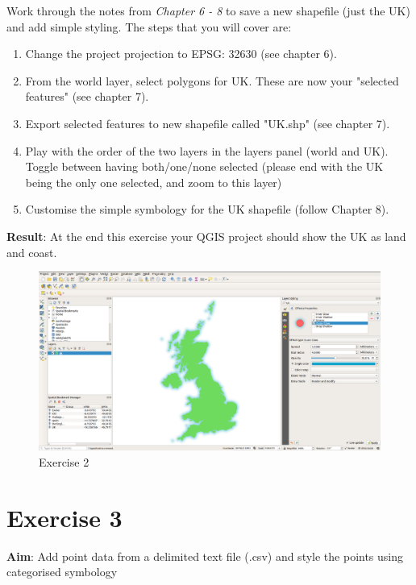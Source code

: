 \documentclass{article}
\begin{document}
Work through the notes from \emph{Chapter 6 - 8} to save a new shapefile (just the UK) and add simple styling. The steps that you will cover are:

\begin{enumerate}
	\item Change the project projection to EPSG: 32630 (see chapter 6).
	\item From the world layer, select polygons for UK. These are now your "selected features" (see chapter 7).
	\item Export selected features to new shapefile called "UK.shp" (see chapter 7).
	\item Play with the order of the two layers in the layers panel (world and UK). Toggle between having both/one/none selected (please end with the UK being the only one selected, and zoom to this layer)
	\item Customise the simple symbology for the UK shapefile (follow Chapter 8). 
\end{enumerate}

\textbf{Result}: At the end this exercise your QGIS project should show the UK as land and coast.\\


\begin{figure}[!h]
	\centering
	\includegraphics[width=1\textwidth]{images/exercise_2.png}
	\caption{Exercise 2}
	\label{ft_fig_firstfig3}
\end{figure}

\newpage
\section{Exercise 3}

\textbf{Aim}: Add point data from a delimited text file (.csv) and style the points using categorised symbology\\
 
\end{document}
